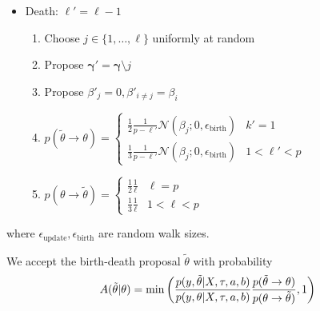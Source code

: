 \begin{itemize}
    \item Death: $\ell' = \ell-1$
    \begin{enumerate}
        \item Choose $j \in \{1, \ldots, \ell\}$ uniformly at random
        \item Propose $\mathbf{\gamma}' = \mathbf{\gamma} \setminus j$ 
        \item Propose $\beta'_{j} = 0, \beta'_{i \neq j} = \beta_{i}$
        \item $p(\tilde{\theta} \rightarrow \theta) = \begin{cases}\frac{1}{2}\frac{1}{p-\ell'} \mathcal{N}(\beta_{j}; 0,\epsilon_{\text{birth}}) & k'=1 \\ \frac{1}{3} \frac{1}{p-\ell'} \mathcal{N}(\beta_{j}; 0,\epsilon_{\text{birth}}) & 1<\ell'<p \end{cases} $
        \item $p(\theta \rightarrow \tilde{\theta}) = \begin{cases}\frac{1}{2}\frac{1}{\ell} & \ell=p \\ \frac{1}{3} \frac{1}{\ell} & 1<\ell<p \end{cases} $
    \end{enumerate}
\end{itemize}
where $\epsilon_{\text{update}}, \epsilon_{\text{birth}}$ are random walk sizes.

We accept the birth-death proposal $\tilde{\theta}$ with probability 
\begin{equation}
    A(\tilde{\theta}|\theta) = \min{\left(\frac{p(y, \tilde{\theta} |  X, \tau, a, b  )}{p(y, \theta |  X, \tau, a, b  )} \frac{p(\tilde{\theta} \rightarrow \theta)}{p(\theta \rightarrow \tilde{\theta})}, 1\right)} \\
\end{equation}

